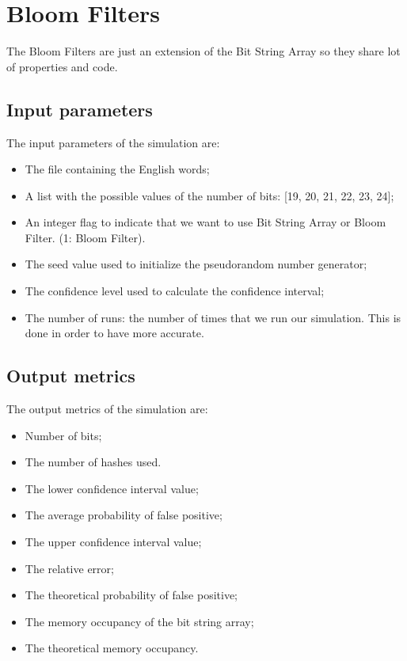 \documentclass[twocolumn,letterpaper]{report}
\begin{document}
{%
		
					\section{Bloom Filters}	 
	 				The Bloom Filters are just an extension of the Bit String Array so they share lot of properties and code. \
	 				
				\subsection{Input parameters}
					The input parameters of the simulation are:
					\begin{itemize}
						\item The file containing the English words;
						\item A list with the possible values of the number of bits: [19, 20, 21, 22, 23, 24];
						\item An integer flag to indicate that we want to use Bit String Array or Bloom Filter. (1: Bloom Filter).
						\item The seed value used to initialize the pseudorandom
number generator;
						\item The confidence level used to calculate the confidence interval;
						\item The number of runs: the number of times that we run our simulation. This is done in order to have more accurate.
					\end{itemize}
					 
			\subsection{Output metrics}
				The output metrics of the simulation are:
				\begin{itemize}
							\item Number of bits;
							\item The number of hashes used.
							\item The lower confidence interval value;
							\item The average probability of false positive;
							\item The upper confidence interval value;
							\item The relative error;
							\item The theoretical probability of false positive;
							\item The memory occupancy of the bit string array;
							\item The theoretical memory occupancy.
				\end{itemize}
				
}
\end{document}

